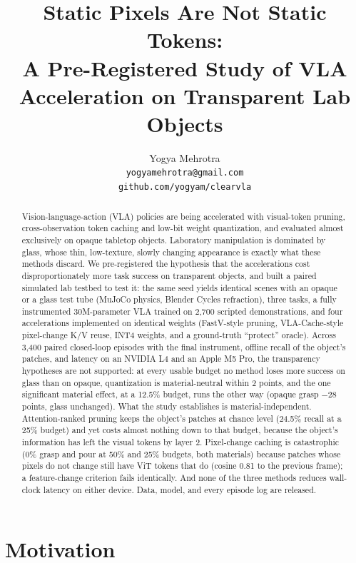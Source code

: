 \documentclass[11pt]{article}
\title{Static Pixels Are Not Static Tokens:\\ A Pre-Registered Study of VLA Acceleration on Transparent Lab Objects}
\author{Yogya Mehrotra \\
  \texttt{yogyamehrotra@gmail.com} \\
  \texttt{github.com/yogyam/clearvla}}
\begin{document}
\maketitle

\begin{abstract}
Vision-language-action (VLA) policies are being accelerated with visual-token pruning, cross-observation token caching and low-bit weight quantization, and evaluated almost exclusively on opaque tabletop objects. Laboratory manipulation is dominated by glass, whose thin, low-texture, slowly changing appearance is exactly what these methods discard. We pre-registered the hypothesis that the accelerations cost disproportionately more task success on transparent objects, and built a paired simulated lab testbed to test it: the same seed yields identical scenes with an opaque or a glass test tube (MuJoCo physics, Blender Cycles refraction), three tasks, a fully instrumented 30M-parameter VLA trained on 2,700 scripted demonstrations, and four accelerations implemented on identical weights (FastV-style pruning, VLA-Cache-style pixel-change K/V reuse, INT4 weights, and a ground-truth ``protect'' oracle). Across 3,400 paired closed-loop episodes with the final instrument, offline recall of the object's patches, and latency on an NVIDIA L4 and an Apple M5 Pro, the transparency hypotheses are not supported: at every usable budget no method loses more success on glass than on opaque, quantization is material-neutral within 2 points, and the one significant material effect, at a 12.5\% budget, runs the other way (opaque grasp $-28$ points, glass unchanged). What the study establishes is material-independent. Attention-ranked pruning keeps the object's patches at chance level (24.5\% recall at a 25\% budget) and yet costs almost nothing down to that budget, because the object's information has left the visual tokens by layer 2. Pixel-change caching is catastrophic (0\% grasp and pour at 50\% and 25\% budgets, both materials) because patches whose pixels do not change still have ViT tokens that do (cosine 0.81 to the previous frame); a feature-change criterion fails identically. And none of the three methods reduces wall-clock latency on either device. Data, model, and every episode log are released.
\end{abstract}

\section{Motivation}
\label{sec:motivation}
\end{document}
